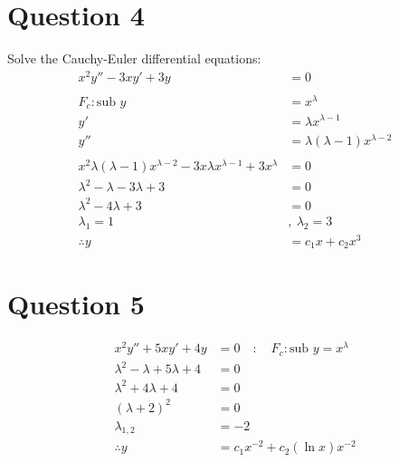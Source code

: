 \documentclass{article}
\begin{document}
\section*{Question 4}
Solve the Cauchy-Euler differential equations:
\begin{align*}
    x^2y''-3xy'+3y                                                        & =0                                \\
    \\
    F_c:\text{sub }y                                                      & =x^\lambda                        \\
    y'                                                                    & = \lambda x^{\lambda-1}           \\
    y''                                                                   & = \lambda(\lambda-1)x^{\lambda-2} \\
    \\
    x^2\lambda(\lambda-1)x^{\lambda-2}-3x\lambda x^{\lambda-1}+3x^\lambda & =0                                \\
    \lambda^2-\lambda-3\lambda+3                                          & =0                                \\
    \lambda^2-4\lambda+3                                                  & =0                                \\
    \lambda_1 = 1                                                         & ,\ \lambda_2 = 3                  \\
    \therefore y                                                          & =c_1x+c_2x^3
\end{align*}
\section*{Question 5}
\begin{align*}
    x^2y''+5xy'+4y               & =0\quad:\quad F_c:\text{sub }y=x^\lambda \\
    \lambda^2-\lambda+5\lambda+4 & =0                                       \\
    \lambda^2+4\lambda+4         & =0                                       \\
    (\lambda+2)^2                & =0                                       \\
    \lambda_{1,2}                & =-2                                      \\
    \therefore y                 & =c_1x^{-2}+c_2(\ln x) x^{-2}
\end{align*}
\end{document}

